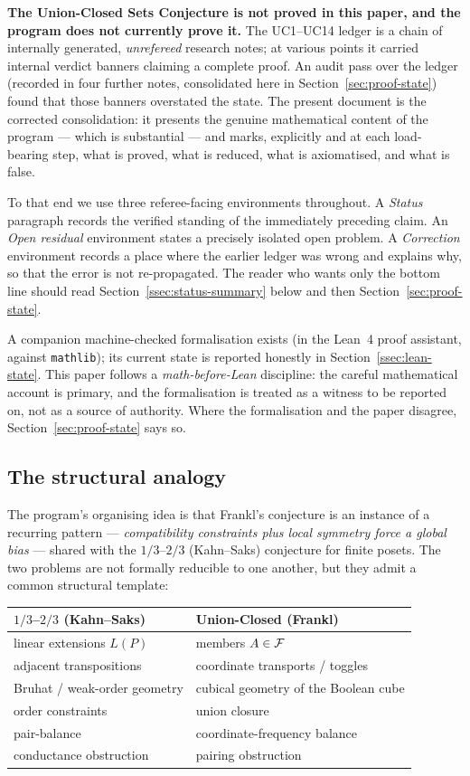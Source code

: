 \textbf{The Union-Closed Sets Conjecture is not proved in this paper,
and the program does not currently prove it.} The UC1--UC14 ledger is a
chain of internally generated, \emph{unrefereed} research notes; at
various points it carried internal verdict banners claiming a complete
proof. An audit pass over the ledger (recorded in four further notes,
consolidated here in Section~\ref{sec:proof-state}) found that those
banners overstated the state. The present document is the corrected
consolidation: it presents the genuine mathematical content of the
program --- which is substantial --- and marks, explicitly and at each
load-bearing step, what is proved, what is reduced, what is
axiomatised, and what is false.

To that end we use three referee-facing environments throughout. A
\emph{Status} paragraph records the verified standing of the
immediately preceding claim. An \emph{Open residual} environment states
a precisely isolated open problem. A \emph{Correction} environment
records a place where the earlier ledger was wrong and explains why, so
that the error is not re-propagated. The reader who wants only the
bottom line should read Section~\ref{ssec:status-summary} below and
then Section~\ref{sec:proof-state}.

A companion machine-checked formalisation exists (in the Lean~4 proof
assistant, against \texttt{mathlib}); its current state is reported
honestly in Section~\ref{ssec:lean-state}. This paper follows a
\emph{math-before-Lean} discipline: the careful mathematical account is
primary, and the formalisation is treated as a witness to be reported
on, not as a source of authority. Where the formalisation and the paper
disagree, Section~\ref{sec:proof-state} says so.

\subsection{The structural analogy}
\label{ssec:analogy}

The program's organising idea is that Frankl's conjecture is an
instance of a recurring pattern --- \emph{compatibility constraints
plus local symmetry force a global bias} --- shared with the
$1/3$--$2/3$ (Kahn--Saks) conjecture for finite posets. The two
problems are not formally reducible to one another, but they admit a
common structural template:

\begin{center}
\begin{tabular}{ll}
\toprule
$1/3$--$2/3$ (Kahn--Saks) & Union-Closed (Frankl)\\
\midrule
linear extensions $L(P)$ & members $A\in\mathcal{F}$\\
adjacent transpositions & coordinate transports / toggles\\
Bruhat / weak-order geometry & cubical geometry of the Boolean cube\\
order constraints & union closure\\
pair-balance & coordinate-frequency balance\\
conductance obstruction & pairing obstruction\\
\bottomrule
\end{tabular}
\end{center}

